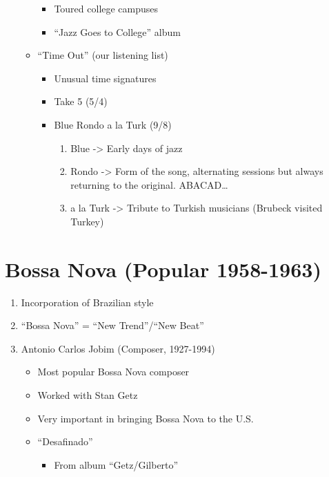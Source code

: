 \documentclass[]{article}
\providecommand{\tightlist}{%
  \setlength{\itemsep}{0pt}\setlength{\parskip}{0pt}}
\begin{document}
\begin{enumerate}
\begin{itemize}
    \begin{itemize}
    \tightlist
    \item
      Toured college campuses
    \item
      ``Jazz Goes to College'' album
    \end{itemize}
  \item
    ``Time Out'' (our listening list)

    \begin{itemize}
    \tightlist
    \item
      Unusual time signatures
    \item
      Take 5 (5/4)
    \item
      Blue Rondo a la Turk (9/8)

      \begin{enumerate}
      \def\labelenumii{\roman{enumii}.}
      \tightlist
      \item
        Blue -\textgreater{} Early days of jazz
      \item
        Rondo -\textgreater{} Form of the song, alternating sessions but
        always returning to the original. ABACAD\ldots{}
      \item
        a la Turk -\textgreater{} Tribute to Turkish musicians (Brubeck
        visited Turkey)
      \end{enumerate}
    \end{itemize}
  \end{itemize}
\end{enumerate}

\section{Bossa Nova (Popular
1958-1963)}\label{bossa-nova-popular-1958-1963}

\begin{enumerate}
\def\labelenumi{\arabic{enumi}.}
\tightlist
\item
  Incorporation of Brazilian style
\item
  ``Bossa Nova'' = ``New Trend''/``New Beat''
\item
  Antonio Carlos Jobim (Composer, 1927-1994)

  \begin{itemize}
  \tightlist
  \item
    Most popular Bossa Nova composer
  \item
    Worked with Stan Getz
  \item
    Very important in bringing Bossa Nova to the U.S.
  \item
    ``Desafinado''

    \begin{itemize}
    \tightlist
    \item
      From album ``Getz/Gilberto''
    \end{itemize}
  \end{itemize}
\end{enumerate}
\end{document}
